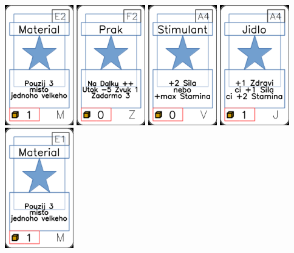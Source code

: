 \documentclass[a4paper]{article}
\begin{document}
	\includegraphics[width=3.0cm]{img-1_51}
	\includegraphics[width=3.0cm]{img-1_86}
	\includegraphics[width=3.0cm]{img-1_63}
	\includegraphics[width=3.0cm]{img-1_3}
	\includegraphics[width=3.0cm]{img-1_50}
\end{document}
